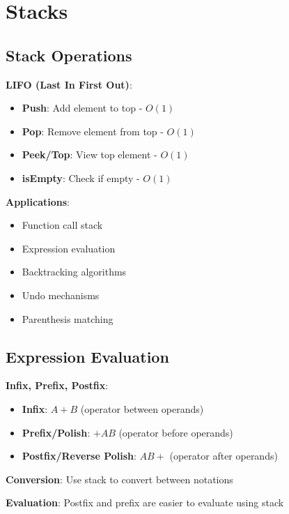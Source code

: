 \documentclass[12pt,a4paper]{report}
\begin{document}
\section{Stacks}

\subsection{Stack Operations}
\begin{concept}
\textbf{LIFO (Last In First Out)}:
\begin{itemize}
    \item \textbf{Push}: Add element to top - $O(1)$
    \item \textbf{Pop}: Remove element from top - $O(1)$
    \item \textbf{Peek/Top}: View top element - $O(1)$
    \item \textbf{isEmpty}: Check if empty - $O(1)$
\end{itemize}

\textbf{Applications}:
\begin{itemize}
    \item Function call stack
    \item Expression evaluation
    \item Backtracking algorithms
    \item Undo mechanisms
    \item Parenthesis matching
\end{itemize}
\end{concept}

\subsection{Expression Evaluation}
\begin{concept}
\textbf{Infix, Prefix, Postfix}:
\begin{itemize}
    \item \textbf{Infix}: $A + B$ (operator between operands)
    \item \textbf{Prefix/Polish}: $+ A B$ (operator before operands)
    \item \textbf{Postfix/Reverse Polish}: $A B +$ (operator after operands)
\end{itemize}

\textbf{Conversion}: Use stack to convert between notations

\textbf{Evaluation}: Postfix and prefix are easier to evaluate using stack
\end{concept}
\end{document}
